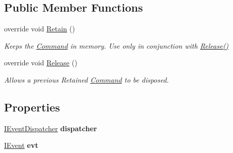 \subsection*{Public Member Functions}
\begin{DoxyCompactItemize}
\item 
\hypertarget{classstrange_1_1extensions_1_1command_1_1impl_1_1_event_command_a49705cc9260bd79ba51606523700330f}{override void \hyperlink{classstrange_1_1extensions_1_1command_1_1impl_1_1_event_command_a49705cc9260bd79ba51606523700330f}{Retain} ()}\label{classstrange_1_1extensions_1_1command_1_1impl_1_1_event_command_a49705cc9260bd79ba51606523700330f}

\begin{DoxyCompactList}\small\item\em Keeps the \hyperlink{classstrange_1_1extensions_1_1command_1_1impl_1_1_command}{Command} in memory. Use only in conjunction with {\ttfamily \hyperlink{classstrange_1_1extensions_1_1command_1_1impl_1_1_event_command_a9abf01833e08403f97f631615f1fcc42}{Release()}} \end{DoxyCompactList}\item 
\hypertarget{classstrange_1_1extensions_1_1command_1_1impl_1_1_event_command_a9abf01833e08403f97f631615f1fcc42}{override void \hyperlink{classstrange_1_1extensions_1_1command_1_1impl_1_1_event_command_a9abf01833e08403f97f631615f1fcc42}{Release} ()}\label{classstrange_1_1extensions_1_1command_1_1impl_1_1_event_command_a9abf01833e08403f97f631615f1fcc42}

\begin{DoxyCompactList}\small\item\em Allows a previous Retained \hyperlink{classstrange_1_1extensions_1_1command_1_1impl_1_1_command}{Command} to be disposed. \end{DoxyCompactList}\end{DoxyCompactItemize}
\subsection*{Properties}
\begin{DoxyCompactItemize}
\item 
\hypertarget{classstrange_1_1extensions_1_1command_1_1impl_1_1_event_command_a7636e8b4c3c01ed4f32818fd22d2bd76}{\hyperlink{interfacestrange_1_1extensions_1_1dispatcher_1_1eventdispatcher_1_1api_1_1_i_event_dispatcher}{I\-Event\-Dispatcher} {\bfseries dispatcher}}\label{classstrange_1_1extensions_1_1command_1_1impl_1_1_event_command_a7636e8b4c3c01ed4f32818fd22d2bd76}

\item 
\hypertarget{classstrange_1_1extensions_1_1command_1_1impl_1_1_event_command_a1a2d078ac2c9053cb164bd6eb4e522e8}{\hyperlink{interfacestrange_1_1extensions_1_1dispatcher_1_1eventdispatcher_1_1api_1_1_i_event}{I\-Event} {\bfseries evt}}\label{classstrange_1_1extensions_1_1command_1_1impl_1_1_event_command_a1a2d078ac2c9053cb164bd6eb4e522e8}

\end{DoxyCompactItemize}


